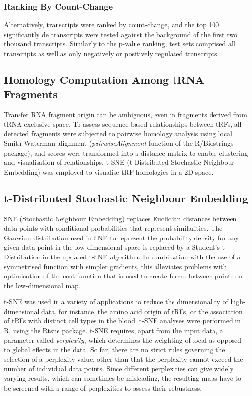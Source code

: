 \begin{method}
\subsubsection{Ranking By Count-Change}
Alternatively, transcripts were ranked by count-change, and the top 100 significantly \ac{de} transcripts were tested against the background of the first two thousand transcripts. Similarly to the p-value ranking, test sets comprised all transcripts as well as only negatively or positively regulated transcripts.

\subsection{Homology Computation Among tRNA Fragments}
Transfer RNA fragment origin can be ambiguous, even in fragments derived from tRNA-exclusive space. To assess sequence-based relationships between tRFs, all detected fragments were subjected to pairwise homology analysis using local Smith-Waterman alignment (\emph{pairwiseAlignment} function of the R/Biostrings package), and scores were transformed into a distance matrix to enable clustering and visualisation of relationships. t-SNE (t-Distributed Stochastic Neighbour Embedding) was employed to visualise tRF homologies in a 2D space.

\subsection{t-Distributed Stochastic Neighbour Embedding} \label{sec:stroke:tsne}
SNE (Stochastic Neighbour Embedding) replaces Euclidian distances between data points with conditional probabilities that represent similarities. The Gaussian distribution used in SNE to represent the probability density for any given data point in the low-dimensional space is replaced by a Student's t-Distribution in the updated t-SNE algorithm. In combination with the use of a symmetrised function with simpler gradients, this alleviates problems with optimisation of the cost function that is used to create forces between points on the low-dimensional map.\cite{Maaten2008}

t-SNE was used in a variety of applications to reduce the dimensionality of high-dimensional data, for instance, the amino acid origin of tRFs, or the association of tRFs with distinct cell types in the blood. t-SNE analyses were performed in R, using the Rtsne package.\cite{Krijthe2015} t-SNE requires, apart from the input data, a parameter called \emph{perplexity}, which determines the weighting of local as opposed to global effects in the data. So far, there are no strict rules governing the selection of a perplexity value, other than that the perplexity cannot exceed the number of individual data points. Since different perplexities can give widely varying results, which can sometimes be misleading, the resulting maps have to be screened with a range of perplexities to assess their robustness.


\end{method}
